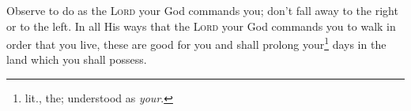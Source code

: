 \begin{enumerate}
    \setcounter{enumi}{31}
     Observe to do as the \textsc{Lord} your God commands you; don't fall away to the right or to the left.%
     In all His ways that the \textsc{Lord} your God commands you to walk in order that you live, these are good for you and shall prolong your\footnote{lit., the; understood as \textit{your}.} days in the land which you shall possess.%
\end{enumerate}
